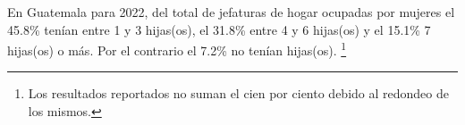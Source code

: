 En Guatemala para 2022, del total de jefaturas de hogar ocupadas por mujeres el 45.8\% tenían entre 1 y 3 hijas(os), el 31.8\% entre 4 y 6 hijas(os) y el 15.1\% 7 hijas(os) o más. Por el contrario el 7.2\% no tenían hijas(os). \footnote{Los resultados reportados no suman el cien por ciento debido al redondeo de los mismos.}